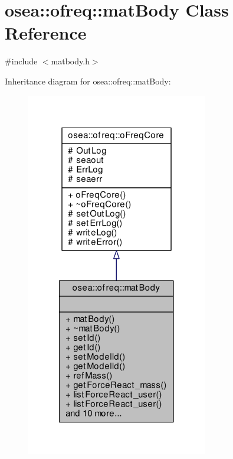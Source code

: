 \hypertarget{classosea_1_1ofreq_1_1mat_body}{\section{osea\-:\-:ofreq\-:\-:mat\-Body Class Reference}
\label{classosea_1_1ofreq_1_1mat_body}
}


{\ttfamily \#include $<$matbody.\-h$>$}



Inheritance diagram for osea\-:\-:ofreq\-:\-:mat\-Body\-:\nopagebreak
\begin{figure}[H]
\begin{center}
\leavevmode
\includegraphics[width=224pt]{classosea_1_1ofreq_1_1mat_body__inherit__graph}
\end{center}
\end{figure}

